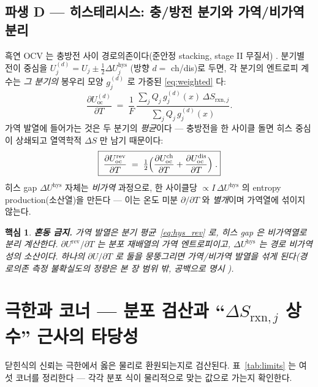 \documentclass[11pt,a4paper]{article}
\newtheorem*{keybox}{핵심}
\newcommand{\rxn}{\mathrm{rxn}}
\newcommand{\rev}{\mathrm{rev}}
\newcommand{\oc}{\mathrm{oc}}
\newcommand{\hys}{\mathrm{hys}}
\begin{document}
\subsection{파생 D — 히스테리시스: 충/방전 분기와 가역/비가역 분리}\label{ssec:hys}
흑연 OCV 는 충방전 사이 경로의존이다(준안정 stacking, stage II 무질서) \cite{hysteresis2018}. 분기별 전이 중심을
$U_j^{(d)}=U_j\pm\tfrac12\Delta U_j^\hys$ (방향 $d=$ ch/dis)로 두면, 각 분기의 엔트로피 계수는 \emph{그 분기의}
봉우리 모양 $g_j^{(d)}$ 로 가중된 \eqref{eq:weighted} 다:
\begin{equation}
\frac{\partial U_\oc^{(d)}}{\partial T}
\;=\;\frac1F\,\frac{\sum_j Q_j\,g_j^{(d)}(x)\,\Delta S_{\rxn,j}}{\sum_j Q_j\,g_j^{(d)}(x)}.
\label{eq:hys_branch}
\end{equation}
가역 발열에 들어가는 것은 두 분기의 \emph{평균}이다 — 충방전을 한 사이클 돌면 히스 중심이 상쇄되고 열역학적
$\Delta S$ 만 남기 때문이다:
\begin{equation}
\boxed{\;\frac{\partial U_\oc^\rev}{\partial T}
\;=\;\tfrac12\Bigl(\frac{\partial U_\oc^\mathrm{ch}}{\partial T}+\frac{\partial U_\oc^\mathrm{dis}}{\partial T}\Bigr)\;.}
\label{eq:hys_rev}
\end{equation}
히스 gap $\Delta U^\hys$ 자체는 \emph{비가역} 과정으로, 한 사이클당 $\propto I\,\Delta U^\hys$ 의 entropy
production(소산열)을 만든다 — 이는 온도 미분 $\partial/\partial T$ 와 \emph{별개}이며 가역열에 섞이지 않는다.
\begin{keybox}
\textbf{혼동 금지.} 가역 발열은 분기 평균~\eqref{eq:hys_rev} 로, 히스 gap 은 비가역열로 \emph{분리} 계산한다.
$\partial U^\rev/\partial T$ 는 분포 재배열의 가역 엔트로피이고, $\Delta U^\hys$ 는 경로 비가역성의 소산이다.
하나의 $\partial U/\partial T$ 로 둘을 뭉뚱그리면 가역/비가역 발열을 섞게 된다(경로의존 측정 불확실도의
정량은 본 장 범위 밖, 공백으로 명시 \cite{hysteresis2018}).
\end{keybox}

\section{극한과 코너 — 분포 검산과 ``$\Delta S_{\rxn,j}$ 상수'' 근사의 타당성}\label{sec:limits}
닫힌식의 신뢰는 극한에서 옳은 물리로 환원되는지로 검산된다. 표~\ref{tab:limits} 는 여섯 코너를 정리한다 —
각각 분포 식이 물리적으로 맞는 값으로 가는지 확인한다.
\end{document}
